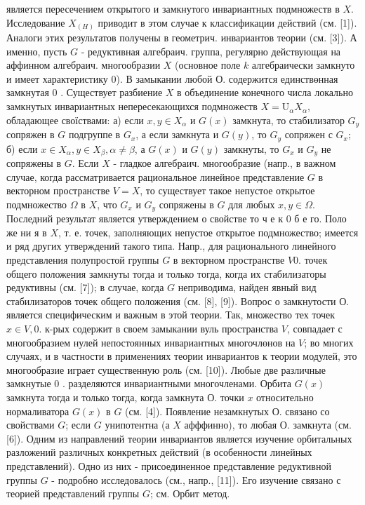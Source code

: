\documentclass[10pt]{article}
\begin{document}
является пересечением открытого и замкнутого инвариантных подмножеств в $X$. Исследование $X_{(H)}$ приводит в этом случае к классификации действий (см. [1]). Аналоги этих результатов получены в геометрич. инвариантов теории (см. [3]). А именно, пусть $G$ - редуктивная алгебраич. группа, регулярно действующая на аффинном алгебраич. многообразии $X$ (основное поле $k$ алгебраически замкнуто и имеет характеристику 0). В замыкании любой О. содержится единствөнная замкнутая 0 . Существует разбиение $X$ в объединение конечного числа локально замкнутых инвариантных непересекающихся подмножеств $X=\mathrm{U}_{\alpha} X_{\alpha}$, обладающее своїствами: а) если $x, y \in X_{\alpha}$ и $G(x)$ замкнута, то стабилизатор $G_{y}$ сопряжен в $G$ подгруппе в $G_{x}$, а если замкнута и $G(y)$, то $G_{y}$ сопряжен с $G_{x} ;$ б) если $x \in X_{\alpha}, y \in X_{\beta}, \alpha \neq \beta$, а $G(x)$ и $G(y)$ замкнуты, то $G_{x}$ и $G_{y}$ не сопряжены в $G$. Если $X$ - гладкое алгебраич. многообразие (напр., в важном случае, когда рассматривается рациональное линейное представление $G$ в векторном пространстве $V=X$, то существует такое непустое открытое подмножество $\Omega$ в $X$, что $G_{x}$ и $G_{y}$ сопряжены в $G$ для любых $x, y \in \Omega$. Последний результат является утверждением о свойстве то ч е к 0 б $е$ го. Поло же ни я в $X$, т. е. точек, заполняющих непустое открытое подмножество; имеется и ряд других утверждений такого типа. Напр., для рационального линейного представления полупростой группы $G$ в векторном пространстве $V 0$. точек общего положения замкнуты тогда и только тогда, когда их стабилизаторы редуктивны (см. [7]); в случае, когда $G$ неприводима, найден явный вид стабилизаторов точек общего положения (см. [8], [9]). Вопрос о замкнутости О. является специфическим и важным в этой теории. Так, множество тех точек $x \in V, 0$. к-рых содержит в своем замыкании вуль пространства $V$, совпадает с многообразием нулей непостоянных инвариантных многочлөнов на $V$; во многих случаях, и в частности в применениях теории инвариантов к теории модулей, это многообразие играет существенную роль (см. [10]). Любые две различные замкнутые 0 . разделяются инвариантными многочленами. Орбита $G(x)$ замкнута тогда и только тогда, когда замкнута О. точки $x$ относительно нормаливатора $G(x)$ в $G$ (см. [4]). Появление незамкнутых О. связано со свойствами $G$; если $G$ унипотентна (а $X$ афффинно), то любая О. замкнута (см. [6]). Одним из направлений теории инвариантов является изучение орбитальных разложений различных конкретных действий (в особенности линейных представлений). Одно из них - присоединенное представление редуктивной группы $G$ - подробно исследовалось (см., напр., [11]). Его изучение связано с теорией представлений группы $G$; см. Орбит метод.
\end{document}
